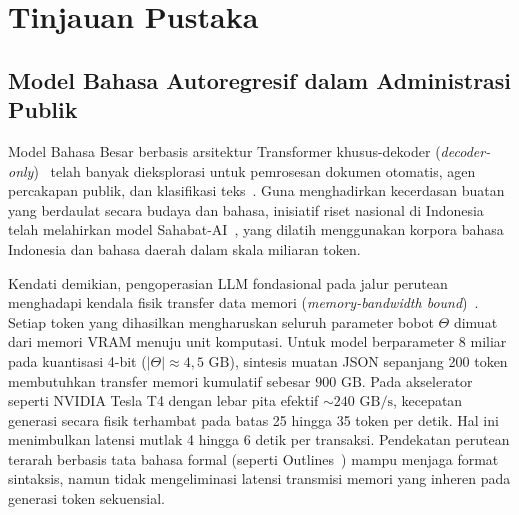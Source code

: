 \documentclass[journal,compsoc]{IEEEtran}
\begin{document}
\section{Tinjauan Pustaka}

\subsection{Model Bahasa Autoregresif dalam Administrasi Publik}
Model Bahasa Besar berbasis arsitektur Transformer khusus-dekoder (\textit{decoder-only})~\cite{vaswani2017attention} telah banyak dieksplorasi untuk pemrosesan dokumen otomatis, agen percakapan publik, dan klasifikasi teks~\cite{achiam2023gpt4,touvron2023llama}. Guna menghadirkan kecerdasan buatan yang berdaulat secara budaya dan bahasa, inisiatif riset nasional di Indonesia telah melahirkan model Sahabat-AI~\cite{sahabatai2024}, yang dilatih menggunakan korpora bahasa Indonesia dan bahasa daerah dalam skala miliaran token.

Kendati demikian, pengoperasian LLM fondasional pada jalur perutean menghadapi kendala fisik transfer data memori (\textit{memory-bandwidth bound})~\cite{aminabadi2022deepspeed}. Setiap token yang dihasilkan mengharuskan seluruh parameter bobot $\Theta$ dimuat dari memori VRAM menuju unit komputasi. Untuk model berparameter 8 miliar pada kuantisasi 4-bit ($|\Theta| \approx 4{,}5 \text{ GB}$), sintesis muatan JSON sepanjang 200 token membutuhkan transfer memori kumulatif sebesar $900 \text{ GB}$. Pada akselerator seperti NVIDIA Tesla T4 dengan lebar pita efektif $\sim 240 \text{ GB/s}$, kecepatan generasi secara fisik terhambat pada batas 25 hingga 35 token per detik. Hal ini menimbulkan latensi mutlak 4 hingga 6 detik per transaksi. Pendekatan perutean terarah berbasis tata bahasa formal (seperti Outlines~\cite{willard2023outlines}) mampu menjaga format sintaksis, namun tidak mengeliminasi latensi transmisi memori yang inheren pada generasi token sekuensial.
\end{document}
